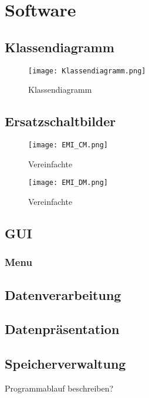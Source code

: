 \section{Software} \label{sec:software}

\subsection{Klassendiagramm} \label{subsec:klassendiagramm}

\begin{figure}[H]
	\begin{minipage}[h]{0.45\linewidth}
		\centering
		\texttt{[image: Klassendiagramm.png]}
		\label{fig:piImpedance}
		\caption{Klassendiagramm \cite{wtf}}
	\end{minipage}
\end{figure}

\subsection{Ersatzschaltbilder} \label{subsec:ersatzschaltbilder}

\begin{figure}[H]
	\begin{minipage}[h]{0.45\linewidth}
		\centering
		\texttt{[image: EMI\_CM.png]}
		\label{fig:piImpedance}
		\caption{Vereinfachte \cite{CM_Schaltung}}
	\end{minipage}
\end{figure}


\begin{figure}[H]
	\begin{minipage}[h]{0.45\linewidth}
		\centering
		\texttt{[image: EMI\_DM.png]}
		\label{fig:piImpedance}
		\caption{Vereinfachte \cite{DM-Schaltung}}
	\end{minipage}
\end{figure}

\subsection{GUI} \label{subsec:gui}



\subsubsection{Menu}\label{menu}


\subsection{Datenverarbeitung} \label{subsec:datenverarbeitung}



\subsection{Datenpräsentation} \label{subsec:datenpräsentation}



\subsection{Speicherverwaltung} \label{subsec:speicherverwaltung}

Programmablauf beschreiben?



